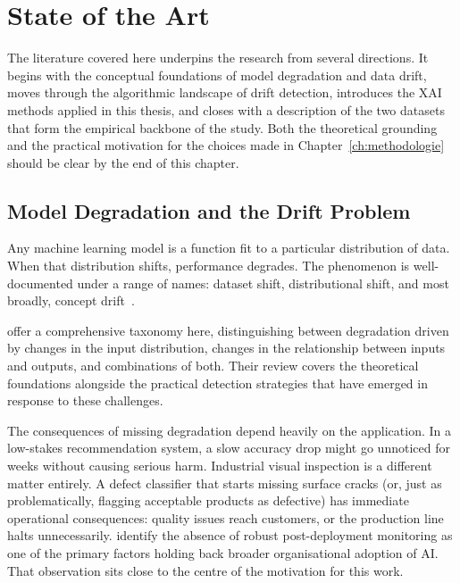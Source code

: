 
\chapter{State of the Art}%
\label{ch:stand-van-zaken}

The literature covered here underpins the research from several directions. It begins with the conceptual foundations of model degradation and data drift, moves through the algorithmic landscape of drift detection, introduces the XAI methods applied in this thesis, and closes with a description of the two datasets that form the empirical backbone of the study. Both the theoretical grounding and the practical motivation for the choices made in Chapter~\ref{ch:methodologie} should be clear by the end of this chapter.

\section{Model Degradation and the Drift Problem}
\label{sec:modeldegradation}

Any machine learning model is a function fit to a particular distribution of data. When that distribution shifts, performance degrades. The phenomenon is well-documented under a range of names: dataset shift, distributional shift, and most broadly, concept drift~\autocite{Bayram2022}.

\textcite{Bayram2022} offer a comprehensive taxonomy here, distinguishing between degradation driven by changes in the input distribution, changes in the relationship between inputs and outputs, and combinations of both. Their review covers the theoretical foundations alongside the practical detection strategies that have emerged in response to these challenges.

The consequences of missing degradation depend heavily on the application. In a low-stakes recommendation system, a slow accuracy drop might go unnoticed for weeks without causing serious harm. Industrial visual inspection is a different matter entirely. A defect classifier that starts missing surface cracks (or, just as problematically, flagging acceptable products as defective) has immediate operational consequences: quality issues reach customers, or the production line halts unnecessarily. \textcite{Radhakrishnan2020} identify the absence of robust post-deployment monitoring as one of the primary factors holding back broader organisational adoption of AI. That observation sits close to the centre of the motivation for this work.

